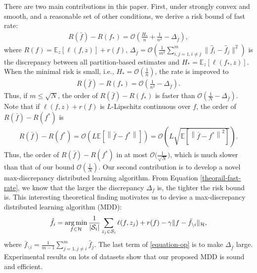 \documentclass{article}
\newcommand{\argmin}{\operatornamewithlimits{arg\,min}}
\begin{document}
There are two main contributions in this paper.
First, under strongly convex and smooth, and a reasonable set of other conditions,
we derive a risk bound of fast rate:
\begin{align}
\label{theorail-fast-rate}
    R(\bar{f})-R(f_\ast)=\mathcal{O}\left(\frac{H_\ast}{n}
    +\frac{1}{n^2}
    -\Delta_{\bar{f}}\right),
  \end{align}
  where $R(f)=\mathbb{E}_{z}[\ell(f,z)]+r(f)$,
  $\Delta_{\bar{f}}=\mathcal{O}\left(\frac{1}{m^2}\sum_{i,j=1,i\not=j}^m\|\hat{f}_i-\hat{f}_j\|^2\right)$ is the discrepancy between all partition-based estimates and
  $H_\ast=\mathbb{E}_{z}\left[\ell(f_\ast,z)\right]$.
When the minimal risk is small, i.e., $H_\ast=\mathcal{O}\left(\frac{1}{n}\right)$,
the rate is improved to
\begin{align*}
    R(\bar{f})-R(f_\ast)=\mathcal{O}\left(\frac{1}{n^2}-\Delta_{\bar{f}}\right).
\end{align*}
Thus, if $m\leq \sqrt{N}$, the order of $R(\bar{f})-R(f_\ast)$ is faster than
$\mathcal{O}\left(\frac{1}{N}-\Delta_{\bar{f}}\right).$
Note that if $\ell(f,z)+r(f)$ is $L$-Lipschitz continuous over $f$,
the order of $R(\bar{f})-R(f^\ast)$ is
\begin{align*}
  R(\bar{f})-R(f^\ast)=\mathcal{O}\left(L\mathbb{E}\left[\left\|\bar{f}-f^\ast\right\|\right]\right)=\mathcal{O}\left(L\sqrt{\mathbb{E}\left[\left\|\bar{f}-f^\ast\right\|^2\right]}\right).
\end{align*}
Thus, the order of $R(\bar{f})-R(f^\ast)$ in \cite{zhang2012communication,Zhang2013,lin2017distributed}
 at most $\mathcal{O}\big({\frac{1}{\sqrt{N}}}\big)$,
 which is much slower than that of our bound $\mathcal{O}\left({\frac{1}{N}}\right)$.
Our second contribution is to develop a novel max-discrepancy distributed learning algorithm.
From Equation \eqref{theorail-fast-rate},
we know that the larger the discrepancy $\Delta_{\bar{f}}$ is, the tighter the risk bound is.
This  interesting theoretical finding motivates us to devise a max-discrepancy distributed learning algorithm (MDD):
\begin{align}
\label{equation-op}
  \hat{f}_i=\argmin_{f\in\mathcal{H}}\frac{1}{|\mathcal{S}_i|}\sum_{z_j\in\mathcal{S}_i}\ell(f,z_j)+r(f)-\gamma \|f-\bar{f}_{\backslash i}\|_\mathcal{H},
\end{align}
where $\bar{f}_{\backslash i}=\frac{1}{m-1}\sum_{j=1,j\not =i}^m\hat{f}_j$.
The last term of \eqref{equation-op} is to make $\Delta_{\bar{f}}$ large.
Experimental results on lots of datasets show that our proposed MDD is sound and efficient.
\end{document}
